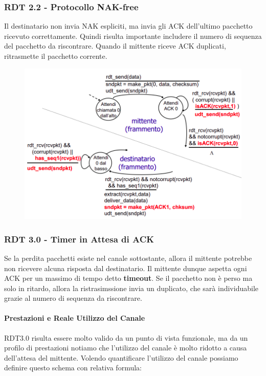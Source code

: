 \documentclass{article}
\begin{document}
\newpage

\subsubsection{RDT 2.2 - Protocollo NAK-free}

Il destinatario non invia NAK espliciti, ma invia gli ACK dell'ultimo pacchetto ricevuto correttamente. Quindi risulta importante includere il numero di sequenza del pacchetto da riscontrare.
Quando il mittente riceve ACK duplicati, ritrasmette il pacchetto corrente.

\begin{figure}[htbp]
    \center
    \includegraphics[scale=0.4]{img/RDT2.2.png}
\end{figure}

\subsubsection{RDT 3.0 - Timer in Attesa di ACK}

Se la perdita pacchetti esiste nel canale sottostante, allora il mittente potrebbe non ricevere alcuna risposta dal destinatario.
Il mittente dunque aspetta ogni ACK per un massimo di tempo detto \textbf{timeout}. Se il pacchetto non è perso ma solo in ritardo, allora la ristrasimssione invia un duplicato, che sarà individuabile grazie al numero di sequenza da riscontrare.

\paragraph{Prestazioni e Reale Utilizzo del Canale} RDT3.0 risulta essere molto valido da un punto di vista funzionale, ma da un profilo di prestazioni notiamo che l'utilizzo del canale è molto ridotto a causa dell'attesa del mittente. Volendo quantificare l'utilizzo del canale possiamo definire questo schema con relativa formula:
\end{document}
